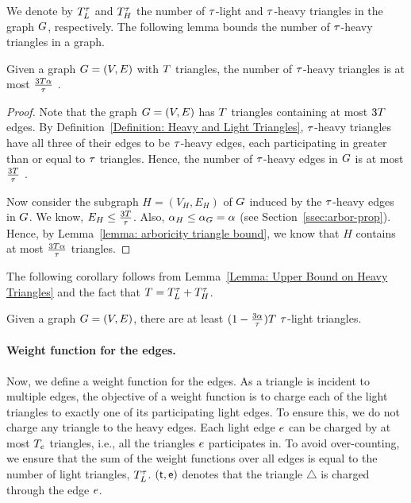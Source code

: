 We denote by $T^{\tau}_{L}$ and $T^{\tau}_{H}$ 
the number of $\tau$-light and $\tau$-heavy triangles in the graph $G$, respectively. 
The following lemma bounds the number of $\tau$-heavy triangles in a graph.
\begin{lemma}\label{Lemma: Upper Bound on Heavy Triangles}
Given a graph $G = (V,E)$ with $T$ triangles, the number of $\tau$-heavy triangles is at most $\frac{3T\alpha}{\tau}$  .
    \begin{proof}
        Note that the graph $G = (V,E)$ has $T$ triangles containing at most $3T$ edges. By Definition~\ref{Definition: Heavy and Light Triangles}, $\tau$-heavy triangles have all three of their edges to be $\tau$-heavy edges, each participating in greater than or equal to $\tau$ triangles. Hence, the number of $\tau$-heavy edges in $G$ is at most $\frac{3T}{\tau}$ .

        Now consider the subgraph $H = (V_H, E_H)$ of $G$ induced by the $\tau$-heavy edges in $G$. We know, $E_H \leq \frac{3T}{\tau}$. Also, $\alpha_{H} \leq \alpha_{G} = \alpha$ (see Section~\ref{ssec:arbor-prop}). Hence, by Lemma~\ref{lemma: arboricity triangle bound}, we know that $H$ contains at most $\frac{3T\alpha}{\tau}$ triangles.
    \end{proof}
\end{lemma}
The following corollary follows from Lemma~\ref{Lemma: Upper Bound on Heavy Triangles} and the fact that $T = T^{\tau}_{L} + T^{\tau}_{H}$. 
\begin{corollary}\label{Corollary: Lower Bound on Light Triangles}
    Given a graph $G = (V,E)$, there are at least $(1-\frac{3\alpha}{\tau}) T$  $\tau$-light triangles.
\end{corollary}

\paragraph*{Weight function for the edges.}
Now, we define a weight function for the edges. As a triangle is incident to multiple edges, the objective of a weight function is to charge each of the light triangles to exactly one of its participating light edges. To ensure this, we do not charge any triangle to the heavy edges. Each light edge $e$ can be charged by at most $T_e$ triangles, i.e., all the triangles $e$ participates in. To avoid over-counting, we ensure that the sum of the weight functions over all edges is equal to the number of light triangles, $T^{\tau}_{L}$. $\left({\sf t,e}\right)$ denotes that the triangle $\triangle$ is charged through the edge $e$.

